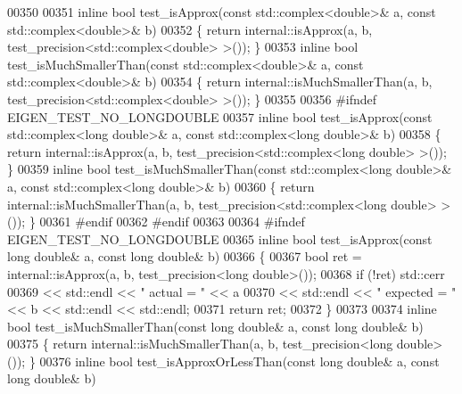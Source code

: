 \begin{DoxyCode}
00350 
00351 \textcolor{keyword}{inline} \textcolor{keywordtype}{bool} test\_isApprox(\textcolor{keyword}{const} std::complex<double>& a, \textcolor{keyword}{const} std::complex<double>& b)
00352 \{ \textcolor{keywordflow}{return} internal::isApprox(a, b, test\_precision<std::complex<double> >()); \}
00353 \textcolor{keyword}{inline} \textcolor{keywordtype}{bool} test\_isMuchSmallerThan(\textcolor{keyword}{const} std::complex<double>& a, \textcolor{keyword}{const} std::complex<double>& b)
00354 \{ \textcolor{keywordflow}{return} internal::isMuchSmallerThan(a, b, test\_precision<std::complex<double> >()); \}
00355 
00356 \textcolor{preprocessor}{#ifndef EIGEN\_TEST\_NO\_LONGDOUBLE}
00357 \textcolor{keyword}{inline} \textcolor{keywordtype}{bool} test\_isApprox(\textcolor{keyword}{const} std::complex<long double>& a, \textcolor{keyword}{const} std::complex<long double>& b)
00358 \{ \textcolor{keywordflow}{return} internal::isApprox(a, b, test\_precision<std::complex<long double> >()); \}
00359 \textcolor{keyword}{inline} \textcolor{keywordtype}{bool} test\_isMuchSmallerThan(\textcolor{keyword}{const} std::complex<long double>& a, \textcolor{keyword}{const} std::complex<long double>& b)
00360 \{ \textcolor{keywordflow}{return} internal::isMuchSmallerThan(a, b, test\_precision<std::complex<long double> >()); \}
00361 \textcolor{preprocessor}{#endif}
00362 \textcolor{preprocessor}{#endif}
00363 
00364 \textcolor{preprocessor}{#ifndef EIGEN\_TEST\_NO\_LONGDOUBLE}
00365 \textcolor{keyword}{inline} \textcolor{keywordtype}{bool} test\_isApprox(\textcolor{keyword}{const} \textcolor{keywordtype}{long} \textcolor{keywordtype}{double}& a, \textcolor{keyword}{const} \textcolor{keywordtype}{long} \textcolor{keywordtype}{double}& b)
00366 \{
00367     \textcolor{keywordtype}{bool} ret = internal::isApprox(a, b, test\_precision<long double>());
00368     \textcolor{keywordflow}{if} (!ret) std::cerr
00369         << std::endl << \textcolor{stringliteral}{"    actual   = "} << a
00370         << std::endl << \textcolor{stringliteral}{"    expected = "} << b << std::endl << std::endl;
00371     \textcolor{keywordflow}{return} ret;
00372 \}
00373 
00374 \textcolor{keyword}{inline} \textcolor{keywordtype}{bool} test\_isMuchSmallerThan(\textcolor{keyword}{const} \textcolor{keywordtype}{long} \textcolor{keywordtype}{double}& a, \textcolor{keyword}{const} \textcolor{keywordtype}{long} \textcolor{keywordtype}{double}& b)
00375 \{ \textcolor{keywordflow}{return} internal::isMuchSmallerThan(a, b, test\_precision<long double>()); \}
00376 \textcolor{keyword}{inline} \textcolor{keywordtype}{bool} test\_isApproxOrLessThan(\textcolor{keyword}{const} \textcolor{keywordtype}{long} \textcolor{keywordtype}{double}& a, \textcolor{keyword}{const} \textcolor{keywordtype}{long} \textcolor{keywordtype}{double}& b)

\end{DoxyCode}

